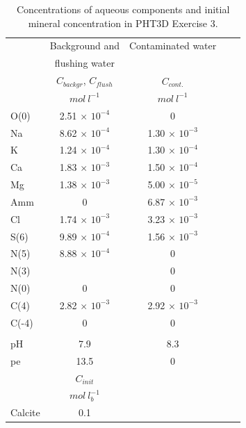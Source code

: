 \begin{table}
\caption{Concentrations of aqueous components and initial mineral concentration in PHT3D Exercise 3.}
\begin{center}
\begin{tabular}{l c c c c }
\toprule
      & \multicolumn{1}{c}{Background and} & \multicolumn{1}{c}{Contaminated water} \\
      & \multicolumn{1}{c}{flushing water} &                & \\
      & \multicolumn{1}{c}{$C_{backgr}$, $C_{flush}$} & \multicolumn{1}{c}{$C_{cont.}$} \\
      &    $mol\ l^{-1}$   & $mol\ l^{-1}$ \\ 
\midrule
O(0)     & 2.51 $\times$ $10^{-4}$    & $0$  \\
Na       & 8.62 $\times$ $10^{-4}$    & 1.30 $\times$ $10^{-3}$ \\
K        & 1.24 $\times$ $10^{-4}$    & 1.30 $\times$ $10^{-4}$ \\
Ca       & 1.83 $\times$ $10^{-3}$    & 1.50 $\times$ $10^{-4}$ \\
Mg       & 1.38 $\times$ $10^{-3}$    & 5.00 $\times$ $10^{-5}$ \\
Amm      & $0$                        & 6.87 $\times$ $10^{-3}$ \\
Cl       & 1.74 $\times$ $10^{-3}$    & 3.23 $\times$ $10^{-3}$ \\
S(6)     & 9.89 $\times$ $10^{-4}$    & 1.56 $\times$ $10^{-3}$ \\
N(5)     & 8.88 $\times$ $10^{-4}$    & $0$ \\
N(3)     &                            & $0$ \\ 
N(0)     &    $0$                     & $0$ \\ 
C(4)     & 2.82 $\times$ $10^{-3}$    & 2.92 $\times$ $10^{-3}$ \\ 
C(-4)    &  $0$                       &   $0$ \\ 
 & & \\
pH    & 7.9               & 8.3             \\
pe    & 13.5              & 0            \\
\midrule 
        &      $C_{init}$       &          \\
                &        $mol\ l_b^{-1}$     &          \\
Calcite &      0.1             &          \\
\bottomrule

\end{tabular}
\label{bruno_caqu}
\end{center}
\end{table}


